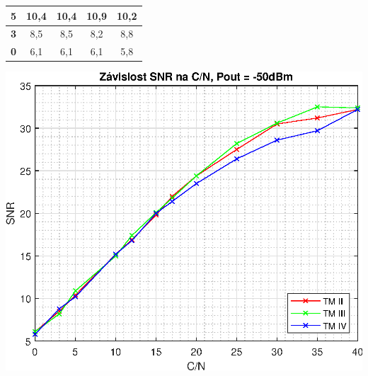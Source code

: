 \documentclass[10pt, a4paper]{article}%
\begin{document}
\begin{table}[ht!]
\begin{minipage}{0.5\textwidth}
{\begin{tabular}{|ccccc|}
        \multicolumn{1}{|c|}{\textbf{5}}  & \multicolumn{1}{c|}{10,4} & \multicolumn{1}{c|}{10,4} & \multicolumn{1}{c|}{10,9} & 10,2 \\ \hline
        \multicolumn{1}{|c|}{\textbf{3}}  & \multicolumn{1}{c|}{8,5}  & \multicolumn{1}{c|}{8,5}  & \multicolumn{1}{c|}{8,2}  & 8,8  \\ \hline
        \multicolumn{1}{|c|}{\textbf{0}}  & \multicolumn{1}{c|}{6,1}  & \multicolumn{1}{c|}{6,1}  & \multicolumn{1}{c|}{6,1}  & 5,8  \\ \hline
        \end{tabular}%
    }
\end{minipage}
\hfill
\begin{minipage}{0.45\textwidth}
    \centering
    \includegraphics[width=1\textwidth]{SNR_CN_TM_MODES.eps}
\end{minipage}

\end{table}
\end{document}
